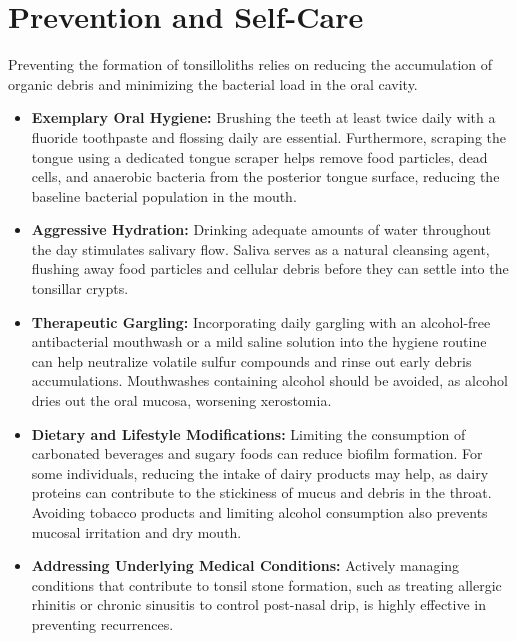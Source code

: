 \section*{Prevention and Self-Care}
Preventing the formation of tonsilloliths relies on reducing the accumulation of organic debris and minimizing the bacterial load in the oral cavity.
\begin{itemize}
    \item \textbf{Exemplary Oral Hygiene:} Brushing the teeth at least twice daily with a fluoride toothpaste and flossing daily are essential. Furthermore, scraping the tongue using a dedicated tongue scraper helps remove food particles, dead cells, and anaerobic bacteria from the posterior tongue surface, reducing the baseline bacterial population in the mouth.
    \item \textbf{Aggressive Hydration:} Drinking adequate amounts of water throughout the day stimulates salivary flow. Saliva serves as a natural cleansing agent, flushing away food particles and cellular debris before they can settle into the tonsillar crypts.
    \item \textbf{Therapeutic Gargling:} Incorporating daily gargling with an alcohol-free antibacterial mouthwash or a mild saline solution into the hygiene routine can help neutralize volatile sulfur compounds and rinse out early debris accumulations. Mouthwashes containing alcohol should be avoided, as alcohol dries out the oral mucosa, worsening xerostomia.
    \item \textbf{Dietary and Lifestyle Modifications:} Limiting the consumption of carbonated beverages and sugary foods can reduce biofilm formation. For some individuals, reducing the intake of dairy products may help, as dairy proteins can contribute to the stickiness of mucus and debris in the throat. Avoiding tobacco products and limiting alcohol consumption also prevents mucosal irritation and dry mouth.
    \item \textbf{Addressing Underlying Medical Conditions:} Actively managing conditions that contribute to tonsil stone formation, such as treating allergic rhinitis or chronic sinusitis to control post-nasal drip, is highly effective in preventing recurrences.
\end{itemize}

